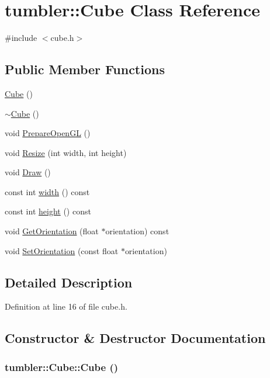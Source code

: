 \hypertarget{classtumbler_1_1_cube}{
\section{tumbler::Cube Class Reference}
\label{classtumbler_1_1_cube}
}


{\ttfamily \#include $<$cube.h$>$}

\subsection*{Public Member Functions}
\begin{DoxyCompactItemize}
\item 
\hyperlink{classtumbler_1_1_cube_ac48d6e76d4b68b24f5fbffd445ba43f1}{Cube} ()
\item 
\hyperlink{classtumbler_1_1_cube_a7f17b53d8eeb3e0803e42904d4b16c88}{$\sim$Cube} ()
\item 
void \hyperlink{classtumbler_1_1_cube_a62b97b480f8cbccf49cfe650c19590ec}{PrepareOpenGL} ()
\item 
void \hyperlink{classtumbler_1_1_cube_aa618965575cca4ce046576220d7e45d7}{Resize} (int width, int height)
\item 
void \hyperlink{classtumbler_1_1_cube_aa5004f01ce9403a31e1fb601efacfdde}{Draw} ()
\item 
const int \hyperlink{classtumbler_1_1_cube_ab943f389a373cb1388662e5f6a6b784e}{width} () const 
\item 
const int \hyperlink{classtumbler_1_1_cube_ab00828281d24db3ce0065cb52f253938}{height} () const 
\item 
void \hyperlink{classtumbler_1_1_cube_a2d995236d8986a916ad365c53bc54ad2}{GetOrientation} (float $\ast$orientation) const 
\item 
void \hyperlink{classtumbler_1_1_cube_af2dfb9b62408f6c2773a88653c753860}{SetOrientation} (const float $\ast$orientation)
\end{DoxyCompactItemize}


\subsection{Detailed Description}


Definition at line 16 of file cube.h.



\subsection{Constructor \& Destructor Documentation}
\hypertarget{classtumbler_1_1_cube_ac48d6e76d4b68b24f5fbffd445ba43f1}{
\subsubsection[{Cube}]{\setlength{\rightskip}{0pt plus 5cm}tumbler::Cube::Cube ()}}
\label{classtumbler_1_1_cube_ac48d6e76d4b68b24f5fbffd445ba43f1}



